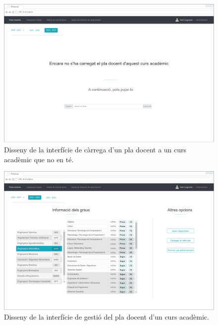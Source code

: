 \documentclass[a4paper,12pt]{ThesisStyle}
\begin{document}
\begin{figure}[H]
	\centering
	\includegraphics[width=\textwidth]{assets/interfaces/administradors/plansDocents/mainNoCarregat.pdf}
	\caption{\label{img:plansDocents_mainNoCarregat}Disseny de la interfície de càrrega d'un pla docent a un curs acadèmic que no en té.}
\end{figure}

\begin{figure}[H]
	\centering
	\includegraphics[width=\textwidth]{assets/interfaces/administradors/plansDocents/mainCarregat.pdf}
	\caption{\label{img:plansDocents_mainCarregat}Disseny de la interfície de gestió del pla docent d'un curs acadèmic.}
\end{figure}
\end{document}
